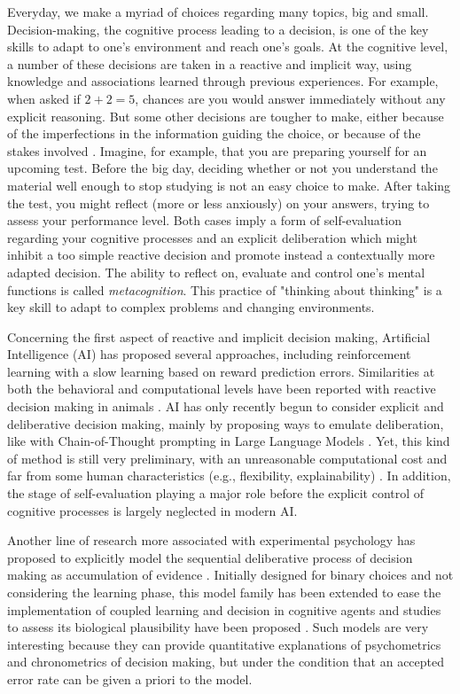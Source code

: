 \documentclass{esannV2}
\begin{document}
Everyday, we make a myriad of choices regarding many topics, big and small. Decision-making, the cognitive process leading to a decision, is one of the key skills to adapt to one's environment and reach one's goals. At the cognitive level, a number of these decisions are taken in a reactive and implicit way, using knowledge and associations learned through previous experiences. For example, when asked if $2+2=5$, chances are you would answer immediately without any explicit reasoning. But some other decisions are tougher to make, either because of the imperfections in the information guiding the choice, or because of the stakes involved \cite{flemingMetacognitionConfidenceReview}. Imagine, for example, that you are preparing yourself for an upcoming test. Before the big day, deciding whether or not you understand the material well enough to stop studying is not an easy choice to make. After taking the test, you might reflect (more or less anxiously) on your answers, trying to assess your performance level. Both cases imply a form of self-evaluation regarding your cognitive processes and an explicit deliberation which might inhibit a too simple reactive decision and promote instead a contextually more adapted decision. The ability to reflect on, evaluate and control one's mental functions is called \textit{metacognition}. This practice of "thinking about thinking" is a key skill to adapt to complex problems and changing environments.

Concerning the first aspect of reactive and implicit decision making, Artificial Intelligence (AI) has proposed several approaches, including reinforcement learning with a slow learning based on reward prediction errors. Similarities at both the behavioral and computational levels have been reported with reactive decision making in animals \cite{suri_neural_1999}. AI has only recently begun to consider explicit and deliberative decision making, mainly by proposing ways to emulate deliberation, like with Chain-of-Thought prompting in Large Language Models \cite{wei_chain--thought_2024}. Yet, this kind of method is still very preliminary, with an unreasonable computational cost and far from some human characteristics (e.g., flexibility, explainability) \cite{lake_building_2017}. In addition, the stage of self-evaluation playing a major role before the explicit control of cognitive processes is largely neglected in modern AI.

Another line of research more associated with experimental psychology has proposed to explicitly model the sequential deliberative process of decision making as accumulation of evidence \cite{ratcliff_diffusion_2016}. Initially designed for binary choices and not considering the learning phase, this model family has been extended to ease the implementation of coupled learning and decision in cognitive agents \cite{van_ravenzwaaij_accumulating_2020} and studies to assess its biological plausibility have been proposed \cite{nallapu2024}. Such models are very interesting because they can provide quantitative explanations of psychometrics and chronometrics of decision making, but under the condition that an accepted error rate can be given a priori to the model.
\end{document}
